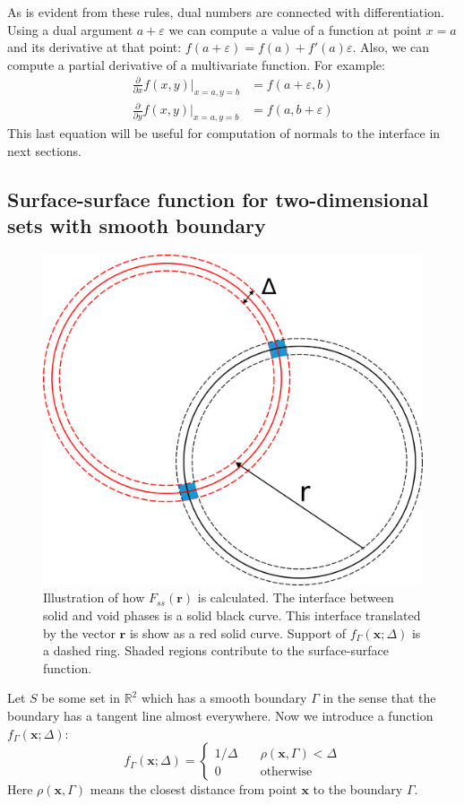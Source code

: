\documentclass[preprint]{elsarticle}
\begin{document}
As is evident from these rules, dual numbers are connected with
differentiation. Using a dual argument $a + \varepsilon$ we can compute a value
of a function at point $x = a$ and its derivative at that point:
$f(a + \varepsilon) = f(a) + f'(a)\varepsilon$. Also, we can compute a partial
derivative of a multivariate function. For example:
\begin{equation}
  \begin{aligned}
    \frac{\partial}{\partial x} f(x, y) \vert_{x = a, y = b} &= f(a + \varepsilon,
    b) \\
    \frac{\partial}{\partial y} f(x, y) \vert_{x = a, y = b} &= f(a, b +
    \varepsilon)
  \end{aligned}
  \label{eq:autonormals}
\end{equation}
This last equation will be useful for computation of normals to the interface in
next sections.

\subsection{Surface-surface function for two-dimensional sets with smooth boundary}
\label{sec:fss-2d}
\begin{figure}
  \centering
  \includegraphics[width=0.8\linewidth]{images/Fss.png}
  \caption[]{Illustration of how $F_{ss}(\bm{r})$ is calculated. The interface
    between solid and void phases is a solid black curve. This interface
    translated by the vector $\bm{r}$ is show as a red solid curve. Support of
    $f_\Gamma(\bm{x}; \Delta)$ is a dashed ring. Shaded regions contribute to
    the surface-surface function.}
  \label{fig:Fss-explained}
\end{figure}
Let $S$ be some set in $\mathbb{R}^2$ which has a smooth boundary $\Gamma$ in
the sense that the boundary has a tangent line almost everywhere. Now we
introduce a function $f_\Gamma(\bm{x}; \Delta)$:
\begin{equation}
  f_\Gamma(\bm{x}; \Delta) = \left\{
  \begin{array}{ll}
    1/\Delta & \quad \rho(\bm{x}, \Gamma) < \Delta \\
    0 & \quad \text{otherwise}
  \end{array}
  \right. \label{eq:delta-sequence}
\end{equation}
Here $\rho(\bm{x}, \Gamma)$ means the closest distance from point $\bm{x}$ to the
boundary $\Gamma$.
\end{document}
